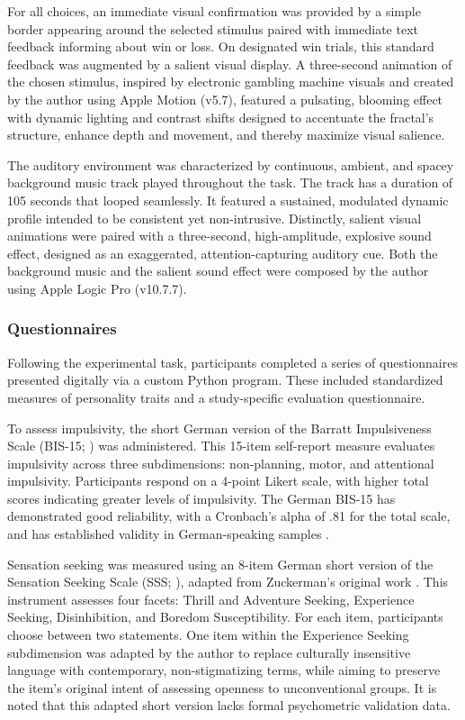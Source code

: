 For all choices, an immediate visual confirmation was provided by a simple border appearing around the selected stimulus paired with immediate text feedback informing about win or loss. On designated win trials, this standard feedback was augmented by a salient visual display. A three-second animation of the chosen stimulus, inspired by electronic gambling machine visuals and created by the author using Apple Motion (v5.7), featured a pulsating, blooming effect with dynamic lighting and contrast shifts designed to accentuate the fractal's structure, enhance depth and movement, and thereby maximize visual salience.

The auditory environment was characterized by continuous, ambient, and spacey background music track played throughout the task. The track has a duration of 105 seconds that looped seamlessly. It featured a sustained, modulated dynamic profile intended to be consistent yet non-intrusive. Distinctly, salient visual animations were paired with a three-second, high-amplitude, explosive sound effect, designed as an exaggerated, attention-capturing auditory cue. Both the background music and the salient sound effect were composed by the author using Apple Logic Pro (v10.7.7).

\subsubsection{Questionnaires}

Following the experimental task, participants completed a series of questionnaires presented digitally via a custom Python program. These included standardized measures of personality traits and a study-specific evaluation questionnaire.

To assess impulsivity, the short German version of the Barratt Impulsiveness Scale (BIS-15; \citealt{meule2011}) was administered. This 15-item self-report measure evaluates impulsivity across three subdimensions: non-planning, motor, and attentional impulsivity. Participants respond on a 4-point Likert scale, with higher total scores indicating greater levels of impulsivity. The German BIS-15 has demonstrated good reliability, with a Cronbach's alpha of .81 for the total scale, and has established validity in German-speaking samples \citep{meule2011}.

Sensation seeking was measured using an 8-item German short version of the Sensation Seeking Scale (SSS; \citealt{grimm2015}), adapted from Zuckerman's original work \citep{zuckerman1979}. This instrument assesses four facets: Thrill and Adventure Seeking, Experience Seeking, Disinhibition, and Boredom Susceptibility. For each item, participants choose between two statements. One item within the Experience Seeking subdimension was adapted by the author to replace culturally insensitive language with contemporary, non-stigmatizing terms, while aiming to preserve the item's original intent of assessing openness to unconventional groups. It is noted that this adapted short version lacks formal psychometric validation data.


